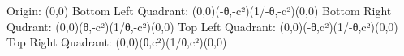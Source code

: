 Origin: (0,0) 
Bottom Left Quadrant: (0,0)(-θ,-c²)(1/-θ,-c²)(0,0) 
Bottom Right Qudrant: (0,0)(θ,-c²)(1/θ,-c²)(0,0) 
Top Left Quadrant: (0,0)(-θ,c²)(1/-θ,c²)(0,0) 
Top Right Quadrant: (0,0)(θ,c²)(1/θ,c²)(0,0)

